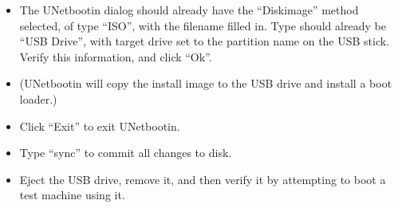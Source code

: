 \begin{itemize}
\item The UNetbootin dialog should already have the ``Diskimage'' method
selected, of type ``ISO'', with the filename filled in. Type should already
be ``USB Drive'', with target drive set to the partition name on the USB
stick. Verify this information, and click ``Ok''.
\item (UNetbootin will copy the install image to the USB drive and install a
boot loader.)
\item Click ``Exit'' to exit UNetbootin.
\item Type ``sync'' to commit all changes to disk.
\item Eject the USB drive, remove it, and then verify it by attempting to
boot a test machine using it.
\end{itemize}

%
